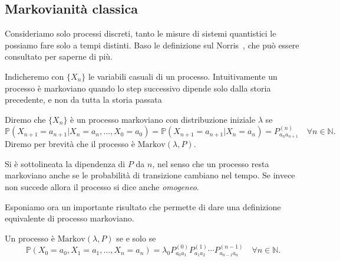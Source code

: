 \documentclass[a4]{article}
\begin{document}
\subsection{Markovianità classica}
Consideriamo solo processi discreti, tanto le misure di sistemi quantistici le possiamo 
fare solo a  tempi distinti. Baso le definizione sul Norris~\cite{norris1998markov}, che
può essere consultato  per saperne di più.

Indicheremo con \(\{X_n\}\) le variabili casuali di un processo. Intuitivamente un processo
è markoviano  quando lo step successivo dipende solo dalla storia precedente, e non da
tutta la storia passata 
\begin{defn} \label{defn:classicalmarkov}
Diremo che \(\{X_n\}\) è  un processo markoviano con distribuzione iniziale \(\lambda\) se
\[\mathbb{P}\left(X_{n+1} = a_{n+1} | X_{n} = a_{n}, \dots, X_0 = a_0\right) =
  \mathbb{P}\left(X_{n+1} = a_{n+1} | X_{n} = a_{n}\right)=P^{(n)}_{a_na_{n+1}} \quad \forall n\in \mathbb{N}.\] 
Diremo per brevità  che il processo è \(\text{Markov}(\lambda,P)\).
\end{defn}
Si è sottolineata la dipendenza di \(P\) da \(n\), nel senso che un processo resta markoviano
anche se le probabilità di transizione cambiano nel tempo. Se invece non succede allora il
processo si dice anche \emph{omogeneo}.

Esponiamo ora un importante risultato  che permette di dare una definizione equivalente di processo markoviano.
\begin{thm} \label{thm:markovalt}
Un processo è \(\text{Markov}(\lambda,P)\) se e solo se 
\[\mathbb{P}\left(X_0 = a_0, X_1 = a_1, \dots, X_n = a_n\right) =
  \lambda_0 P^{(0)}_{a_0a_1} P^{(1)}_{a_1a_2} \cdots P^{(n-1)}_{a_{n-1}a_n}
  \quad \forall n\in \mathbb{N}.\]
\end{thm}
\end{document}
